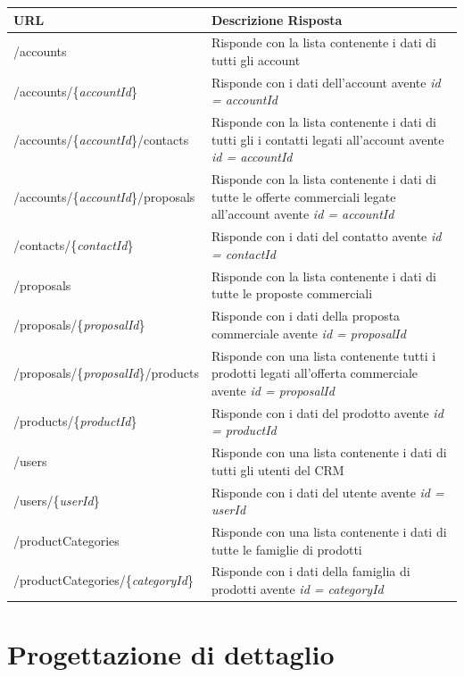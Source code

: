	\begin{small}
		\begin{longtable}{ | l | p{8cm} | }
			\hline \textbf{URL} & \textbf{Descrizione Risposta}\\
			\hline /accounts & Risponde con la lista contenente i dati di tutti gli account\\
			\hline /accounts/\{\textit{accountId}\} & Risponde con i dati dell'account avente \textit{id = accountId}\\    
			\hline /accounts/\{\textit{accountId}\}/contacts & Risponde con la lista contenente i dati di tutti gli i contatti legati all'account avente \textit{id = accountId}\\
			\hline /accounts/\{\textit{accountId}\}/proposals & Risponde con la lista contenente i dati di tutte le offerte commerciali legate all'account avente \textit{id = accountId}\\
			\hline /contacts/\{\textit{contactId}\} & Risponde con i dati del contatto avente \textit{id = contactId}\\
			\hline /proposals & Risponde con la lista contenente i dati di tutte le proposte commerciali\\
			\hline /proposals/\{\textit{proposalId}\} & Risponde con i dati della proposta commerciale avente \textit{id = proposalId}\\    
			\hline /proposals/\{\textit{proposalId}\}/products & Risponde con una lista contenente tutti i prodotti legati all'offerta commerciale avente \textit{id =  proposalId}\\
			\hline /products/\{\textit{productId}\} & Risponde con i dati del prodotto avente \textit{id = productId}\\
			\hline /users & Risponde con una lista contenente i dati di tutti gli utenti del CRM\\
			\hline /users/\{\textit{userId}\} & Risponde con i dati del utente avente \textit{id = userId}\\    
			\hline /productCategories & Risponde con una lista contenente i dati di tutte le famiglie di prodotti\\
			\hline /productCategories/\{\textit{categoryId}\} & Risponde con i dati della famiglia di prodotti avente \textit{id = categoryId}\\		
			\hline 
		\end{longtable}		
	\end{small}
	
\section{Progettazione di dettaglio}

